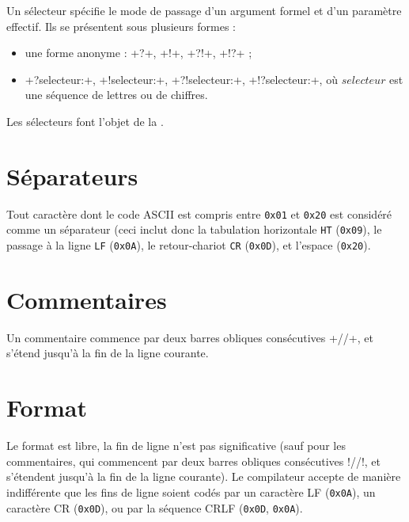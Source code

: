 
Un sélecteur spécifie le mode de passage d'un argument formel et d'un paramètre effectif. Ils se présentent sous plusieurs formes :
\begin{itemize}
  \item une forme anonyme : \plm+?+, \plm+!+, \plm+?!+, \plm+!?+ ;
  \item \plm+?selecteur:+, \plm+!selecteur:+, \plm+?!selecteur:+, \plm+!?selecteur:+, où $selecteur$ est une séquence de lettres ou de chiffres.
\end{itemize}



Les sélecteurs font l'objet de la .

\section{Séparateurs}

Tout caractère dont le code ASCII est compris entre \texttt{0x01} et \texttt{0x20} est considéré comme un séparateur (ceci inclut donc la tabulation horizontale \texttt{HT} (\texttt{0x09}), le passage à la ligne \texttt{LF} (\texttt{0x0A}), le retour-chariot \texttt{CR} (\texttt{0x0D}), et l’espace (\texttt{0x20}).









\section{Commentaires}

Un commentaire commence par deux barres obliques consécutives \plm+//+, et s’étend jusqu’à la fin de la ligne courante.




\section{Format}

Le format est libre, la fin de ligne n’est pas significative (sauf pour les commentaires, qui commencent par deux barres obliques consécutives \plm!//!, et s’étendent jusqu’à la fin de la ligne courante). Le compilateur accepte de manière indifférente que les fins de ligne soient codés par un caractère LF (\texttt{0x0A}), un caractère CR (\texttt{0x0D}), ou par la séquence CRLF (\texttt{0x0D}, \texttt{0x0A}).

